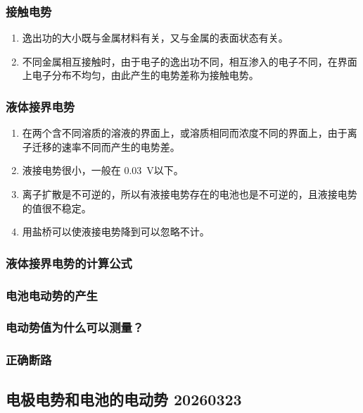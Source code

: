 \subsubsection{接触电势}

\begin{enumerate}
    \item 逸出功的大小既与金属材料有关，又与金属的表面状态有关。
    \item 不同金属相互接触时，由于电子的逸出功不同，相互渗入的电子不同，在界面上电子分布不均匀，由此产生的电势差称为接触电势。
\end{enumerate}

\subsubsection{液体接界电势}

\begin{enumerate}
    \item 在两个含不同溶质的溶液的界面上，或溶质相同而浓度不同的界面上，由于离子迁移的速率不同而产生的电势差。
    \item 液接电势很小，一般在 \qty{0.03}{\volt}以下。
    \item 离子扩散是不可逆的，所以有液接电势存在的电池也是不可逆的，且液接电势的值很不稳定。
    \item 用盐桥可以使液接电势降到可以忽略不计。
\end{enumerate}

\subsubsection{液体接界电势的计算公式}

\subsubsection{电池电动势的产生}

\subsubsection{电动势值为什么可以测量？}

\subsubsection{正确断路}

\subsection{电极电势和电池的电动势 20260323}

